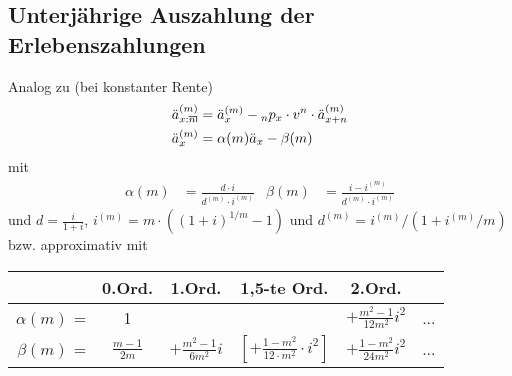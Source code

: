 \documentclass[a4paper,10pt]{article}
\makeatletter
\DeclareRobustCommand{\act}[2][]{%
\def\arraystretch{0}%
\setlength\arraycolsep{0.5pt}%
\setlength\arrayrulewidth{0.5pt}%
\setbox0=\hbox{$\scriptstyle#1\ifx#1\empty{asdf}\else:\fi#2$}%
\begin{array}[b]{*2{@{}>{\scriptstyle}c}|}
\cline{2-2}%
\rule[1.25pt]{0pt}{\ht0}%
#1\ifx#1\empty\else:\fi & #2%
\end{array}%
}
\makeatother
\begin{document}
\subsection{Unterjährige Auszahlung der Erlebenszahlungen}

Analog zu (bei konstanter Rente)
\begin{align*}
 \ddot{a}^{(m)}_{\act[x]{n}} &= \ddot{a}_x^{(m)} - {}_np_x \cdot v^n \cdot \ddot{a}_{x+n}^{(m)}\\
 \ddot{a}_x^{(m)} &= \alpha(m) \ddot{a}_x - \beta(m)
\end{align*}
mit 
\begin{align*}
 \alpha(m)&= \frac{d \cdot i}{d^{(m)} \cdot i^{(m)}} & \beta(m) &= \frac{i-i^{(m)}}{d^{(m)} \cdot i^{(m)}}
\end{align*}
und $d = \frac{i}{1+i}$, $i^{(m)} = m \cdot \left((1+i)^{1/m} -1\right)$ und $d^{(m)} = i^{(m)} / \left(1+i^{(m)}/m\right)$ bzw. approximativ mit
\begin{center}
\begin{tabular}{rccccc}
& 0.Ord. & 1.Ord. & 1,5-te Ord. & 2.Ord. & \\\hline
$\alpha(m)$ = & 1 &  & & $+\frac{m^2-1}{12 m^2} i^2$ & ...\\
$\beta(m)$ = & $\frac{m-1}{2m}$ & $+ \frac{m^2-1}{6 m^2}i$ & $\left[+ \frac{1-m^2}{12\cdot m^2}\cdot i^2\right]$ &$+ \frac{1-m^2}{24 m^2}i^2$ & ...\\[0.3em]\hline 
\end{tabular}
\end{center}
\end{document}
